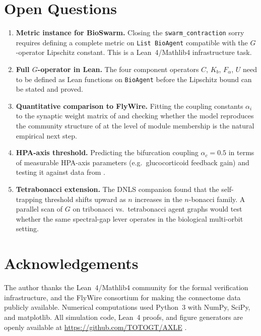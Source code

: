 \documentclass[12pt,a4paper]{article}
\begin{document}
\section{Open Questions}
\label{sec:openq}

\begin{enumerate}[leftmargin=2em, itemsep=3pt]
  \item \textbf{Metric instance for BioSwarm.}  Closing the
    \texttt{swarm\_contraction} sorry requires defining a complete
    metric on \texttt{List BioAgent} compatible with the $G$-operator
    Lipschitz constant.  This is a Lean~4/Mathlib4 infrastructure task.

  \item \textbf{Full $G$-operator in Lean.}  The four component
    operators $C$, $K_{b}$, $F_{\alpha}$, $U$ need to be defined as
    Lean functions on \texttt{BioAgent} before the Lipschitz bound
    can be stated and proved.

  \item \textbf{Quantitative comparison to FlyWire.}  Fitting the
    coupling constants $\alpha_{i}$ to the synaptic weight matrix
    of \cite{Dorkenwald2024} and checking whether the model reproduces
    the community structure of \cite{Schlegel2024} at the level of
    module membership is the natural empirical next step.

  \item \textbf{HPA-axis threshold.}  Predicting the bifurcation
    coupling $\alpha_{c}=0.5$ in terms of measurable HPA-axis
    parameters (e.g.\ glucocorticoid feedback gain) and testing it
    against data from \cite{Bhaskaran2022}.

  \item \textbf{Tetrabonacci extension.}  The DNLS companion
    \cite{Grossi2026_DNLS} found that the self-trapping threshold
    shifts upward as $n$ increases in the $n$-bonacci family. A
    parallel scan of $G$ on tribonacci vs.\ tetrabonacci agent
    graphs would test whether the same spectral-gap lever operates
    in the biological multi-orbit setting.
\end{enumerate}

\section*{Acknowledgements}

The author thanks the Lean~4/Mathlib4 community for the formal
verification infrastructure, and the FlyWire consortium
\cite{Dorkenwald2024} for making the connectome data publicly
available. Numerical computations used Python~3 with NumPy, SciPy,
and matplotlib. All simulation code, Lean~4 proofs, and figure
generators are openly available at \url{https://github.com/TOTOGT/AXLE} \cite{AXLE2026}.
\end{document}
